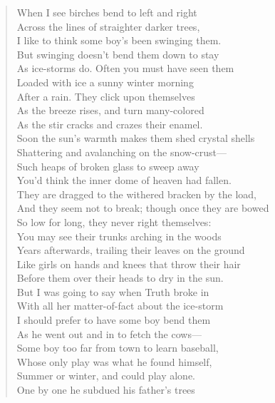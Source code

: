 \filbreak
{}
\begin{verse}
    When I see birches bend to left and right\\
    Across the lines of straighter darker trees,\\
    I like to think some boy’s been swinging them.\\
    But swinging doesn’t bend them down to stay\\
    As ice-storms do. Often you must have seen them\\
    Loaded with ice a sunny winter morning\\
    After a rain. They click upon themselves\\
    As the breeze rises, and turn many-colored\\
    As the stir cracks and crazes their enamel.\\
    Soon the sun’s warmth makes them shed crystal shells\\
    Shattering and avalanching on the snow-crust—\\
    Such heaps of broken glass to sweep away\\
    You'd think the inner dome of heaven had fallen.\\
    They are dragged to the withered bracken by the load,\\
    And they seem not to break; though once they are bowed\\
    So low for long, they never right themselves:\\
    You may see their trunks arching in the woods\\
    Years afterwards, trailing their leaves on the ground\\
    Like girls on hands and knees that throw their hair\\
    Before them over their heads to dry in the sun.\\
    But I was going to say when Truth broke in\\
    With all her matter-of-fact about the ice-storm\\
    I should prefer to have some boy bend them\\
    As he went out and in to fetch the cows—\\
    Some boy too far from town to learn baseball,\\
    Whose only play was what he found himself,\\
    Summer or winter, and could play alone.\\
    One by one he subdued his father's trees\\

\end{verse}
